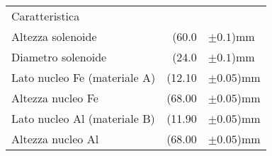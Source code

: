 \begin{table}[h]
    \begin{ruledtabular}
        \begin{tabular}{lrl}
            Caratteristica & & \\
            Altezza solenoide & (60.0 & $\pm 0.1$)mm \\
            Diametro solenoide & (24.0 & $\pm 0.1$)mm \\
            Lato nucleo Fe (materiale A) & (12.10 & $\pm 0.05$)mm \\
            Altezza nucleo Fe & (68.00 & $\pm 0.05$)mm \\
            Lato nucleo Al (materiale B) & (11.90 & $\pm 0.05$)mm \\
            Altezza nucleo Al & (68.00 & $\pm 0.05$)mm \\
        \end{tabular}
    \end{ruledtabular}
\end{table}
